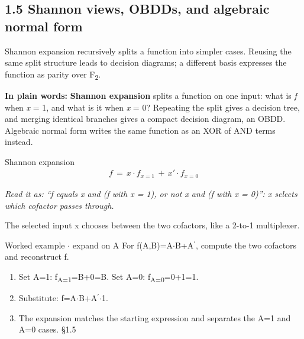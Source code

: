 \documentclass[11pt]{article}
\begin{document}
\begin{keepsection}
\section{1.5 Shannon views, OBDDs, and algebraic normal form}

Shannon expansion recursively splits a function into simpler cases. Reusing the same split structure leads to decision diagrams; a different basis expresses the function as parity over F\textsubscript{2}.

\begin{plainbox}\textbf{In plain words:} \textbf{Shannon expansion} splits a function on one input: what is \textit{f} when \textit{x} = 1, and what is it when \textit{x} = 0? Repeating the split gives a decision tree, and merging identical branches gives a compact decision diagram, an OBDD. Algebraic normal form writes the same function as an XOR of AND terms instead.\end{plainbox}

\begin{equationcard}{Shannon expansion}
\[ \begin{gathered} {f}\, =\, {x}\cdot {f}_{{x}=1}\, +\, {x}'\cdot {f}_{{x}=0} \end{gathered} \]
{\small \emph{Read it as: “f equals x and (f with x = 1), or not x and (f with x = 0)”: x selects which cofactor passes through.}\par The selected input x chooses between the two cofactors, like a 2-to-1 multiplexer.}
\end{equationcard}

\begin{workedbox}{Worked example \ensuremath{\cdot} expand on A}
For f(A,B)=A\ensuremath{\cdot}B+A\ensuremath{{}^{\prime}}, compute the two cofactors and reconstruct f.

\begin{enumerate}
\item Set A=1: f\textsubscript{A=1}=B+0=B. Set A=0: f\textsubscript{A=0}=0+1=1.
\item Substitute: f=A\ensuremath{\cdot}B+A\ensuremath{{}^{\prime}}\ensuremath{\cdot}1.
\item The expansion matches the starting expression and separates the A=1 and A=0 cases. \hfill{\small\color{FAUblue}§1.5}
\end{enumerate}
\end{workedbox}


\end{keepsection}
\end{document}
